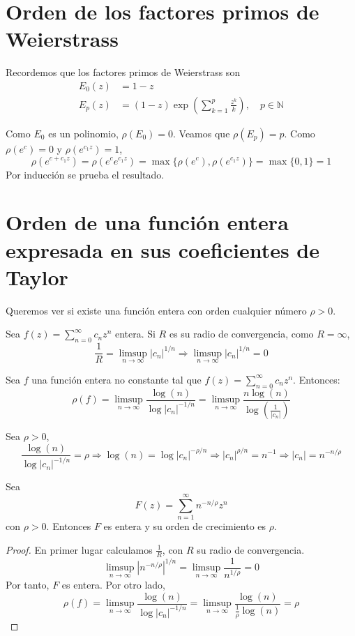 
\section{Orden de los factores primos de Weierstrass}
Recordemos que los factores primos de Weierstrass son
\begin{align*}
    E_0(z) & = 1-z                                                                      \\
    E_p(z) & = (1-z)\exp\left(\sum_{k=1}^p \frac{z^k}{k}\right), \quad p \in \mathbb{N}
\end{align*}

Como $E_0$ es un polinomio, $\rho(E_0) = 0$.
Veamos que $\rho(E_p) = p$.
Como $\rho(e^c) = 0$ y $\rho(e^{c_1z}) = 1$,
$$\rho(e^{c+c_1z}) = \rho(e^ce^{c_1z}) = \max\{\rho(e^c), \rho(e^{c_1z})\} = \max\{0, 1\} = 1$$
Por inducción se prueba el resultado.

\section{Orden de una función entera expresada en sus coeficientes de Taylor}
Queremos ver si existe una función entera con orden cualquier número $\rho > 0$.

Sea $f(z) = \sum_{n=0}^\infty c_nz^n$ entera.
Si $R$ es su radio de convergencia, como $R = \infty$,
$$\frac{1}{R} = \limsup_{n \to \infty} |c_n|^{1/n} \Rightarrow \limsup_{n \to \infty} |c_n|^{1/n} = 0$$

\begin{theorem}
    Sea $f$ una función entera no constante tal que $f(z) = \sum_{n=0}^\infty c_nz^n$.
    Entonces:
    $$\rho(f) = \limsup_{n \to \infty} \frac{\log(n)}{\log|c_n|^{-1/n}} = \limsup_{n \to \infty} \frac{n\log(n)}{\log\left(\frac{1}{|c_n|}\right)}$$
\end{theorem}


Sea $\rho > 0$,
$$\frac{\log(n)}{\log|c_n|^{-1/n}} = \rho \Rightarrow \log(n) = \log|c_n|^{-\rho/n} \Rightarrow |c_n|^{\rho/n} = n^{-1} \Rightarrow |c_n| = n^{-n/\rho}$$

\begin{corollary}
    Sea
    $$F(z) = \sum_{n=1}^\infty n^{-n/\rho}z^n$$
    con $\rho > 0$.
    Entonces $F$ es entera y su orden de crecimiento es $\rho$.
\end{corollary}

\begin{proof}
    En primer lugar calculamos $\frac{1}{R}$, con $R$ su radio de convergencia.
    $$\limsup_{n \to \infty} |n^{-n/\rho}|^{1/n} = \limsup_{n \to \infty} \frac{1}{n^{1/\rho}} = 0$$
    Por tanto, $F$ es entera.
    Por otro lado,
    $$\rho(f) = \limsup_{n \to \infty} \frac{\log(n)}{\log|c_n|^{-1/n}} = \limsup_{n \to \infty} \frac{\log(n)}{\frac{1}{\rho}\log(n)} = \rho$$
\end{proof}

